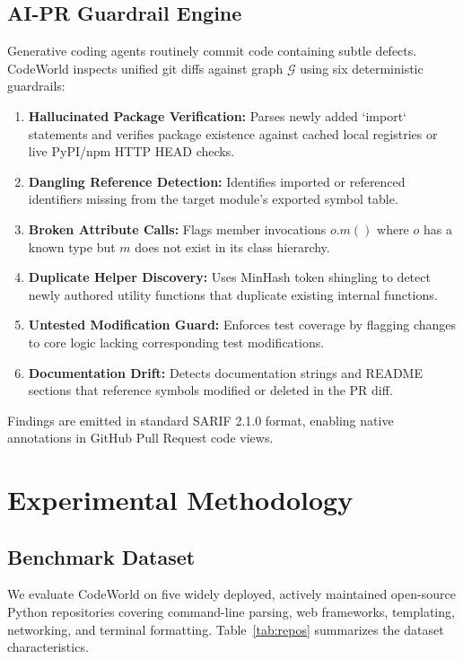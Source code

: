 \documentclass[conference]{IEEEtran}
\begin{document}
\subsection{AI-PR Guardrail Engine}
Generative coding agents routinely commit code containing subtle defects. CodeWorld inspects unified git diffs against graph $\mathcal{G}$ using six deterministic guardrails:
\begin{enumerate}
    \item \textbf{Hallucinated Package Verification:} Parses newly added `import` statements and verifies package existence against cached local registries or live PyPI/npm HTTP HEAD checks.
    \item \textbf{Dangling Reference Detection:} Identifies imported or referenced identifiers missing from the target module's exported symbol table.
    \item \textbf{Broken Attribute Calls:} Flags member invocations $o.m()$ where $o$ has a known type but $m$ does not exist in its class hierarchy.
    \item \textbf{Duplicate Helper Discovery:} Uses MinHash token shingling to detect newly authored utility functions that duplicate existing internal functions.
    \item \textbf{Untested Modification Guard:} Enforces test coverage by flagging changes to core logic lacking corresponding test modifications.
    \item \textbf{Documentation Drift:} Detects documentation strings and README sections that reference symbols modified or deleted in the PR diff.
\end{enumerate}

Findings are emitted in standard SARIF 2.1.0 format, enabling native annotations in GitHub Pull Request code views.

\section{Experimental Methodology}
\label{sec:exp}

\subsection{Benchmark Dataset}
We evaluate CodeWorld on five widely deployed, actively maintained open-source Python repositories covering command-line parsing, web frameworks, templating, networking, and terminal formatting. Table~\ref{tab:repos} summarizes the dataset characteristics.
\end{document}
